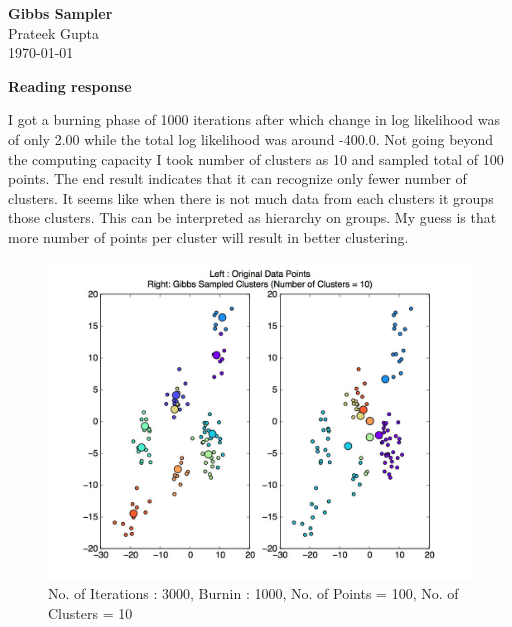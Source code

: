 \documentclass{article}
\begin{document}
\begin{center}
	\textbf{Gibbs Sampler} \\
	Prateek Gupta \\
	\today
\end{center}

\textbf{Reading response}

I got a burning phase of 1000 iterations after which change in log likelihood was of only 2.00 while the total log likelihood was around -400.0. Not going beyond the computing capacity I took number of clusters as 10 and sampled total of 100 points. The end result indicates that it can recognize only fewer number of clusters. It seems like when there is not much data from each clusters it groups those clusters. This can be interpreted as hierarchy on groups.  My guess is that more number of points per cluster will result in better clustering.  

\begin{figure}
	\includegraphics[width=\linewidth]{plot}
	\caption{No. of Iterations : 3000, Burnin : 1000, No. of Points = 100, No. of Clusters = 10}
\end{figure}	
\end{document}
